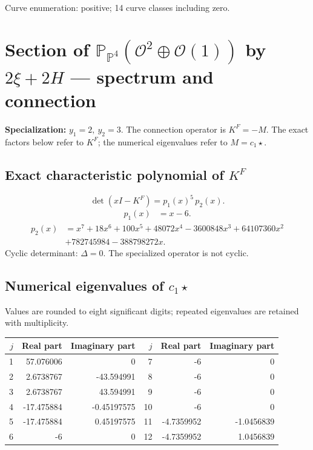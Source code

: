 \documentclass[10pt,a4paper]{article}
\begin{document}
Curve enumeration: positive; 14 curve classes including zero.
\clearpage\section*{Section of $\mathbb P_{\mathbb P^{4}}(\mathcal O^{2}\oplus \mathcal O(1))$ by $2\xi +2H$ --- spectrum and connection}
\textbf{Specialization:} $y_1=2,\ y_2=3$. The connection operator is $K^F=-M$. The exact factors below refer to $K^F$; the numerical eigenvalues refer to $M=c_1\star$.
\subsection*{Exact characteristic polynomial of $K^F$}
\[\det(xI-K^F)=p_{1}(x)^{5}\,p_{2}(x).\]
\[\begin{aligned}p_{1}(x)&=x - 6.\end{aligned}\]
\[\begin{aligned}p_{2}(x)&=x^{7} + 18 x^{6} + 100 x^{5} + 48072 x^{4} - 3600848 x^{3} + 64107360 x^{2}\\&+782745984 - 388798272 x.\end{aligned}\]
Cyclic determinant: $\Delta=0$. The specialized operator is not cyclic.
\subsection*{Numerical eigenvalues of $c_1\star$}
Values are rounded to eight significant digits; repeated eigenvalues are retained with multiplicity.
\begin{center}\small\begin{tabular}{rrr@{\qquad}rrr}\toprule $j$ & Real part & Imaginary part & $j$ & Real part & Imaginary part\\\midrule
1 & 57.076006 & 0 & 7 & -6 & 0\\
2 & 2.6738767 & -43.594991 & 8 & -6 & 0\\
3 & 2.6738767 & 43.594991 & 9 & -6 & 0\\
4 & -17.475884 & -0.45197575 & 10 & -6 & 0\\
5 & -17.475884 & 0.45197575 & 11 & -4.7359952 & -1.0456839\\
6 & -6 & 0 & 12 & -4.7359952 & 1.0456839\\
\bottomrule\end{tabular}\end{center}
\end{document}
